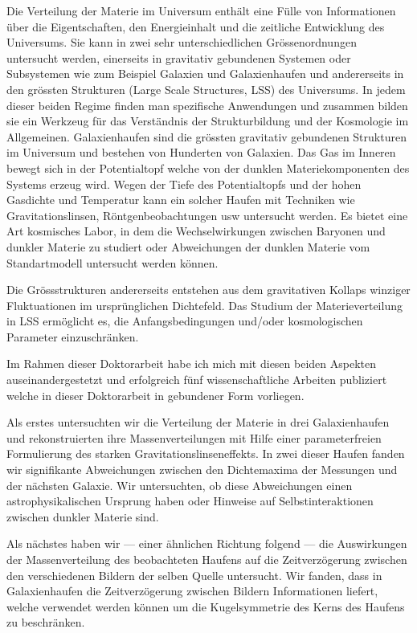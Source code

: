 \documentclass[
  11pt,
  twoside,
  openright,
  titlepage,
  headings=optiontoheadandtoc
]{scrbook}
\begin{document}
Die Verteilung der Materie im Universum enth{\"a}lt eine F{\"u}lle von
Informationen {\"u}ber die Eigentschaften, den Energieinhalt und die zeitliche
Entwicklung des Universums. Sie kann in zwei sehr unterschiedlichen
Gr{\"o}ssenordnungen untersucht werden, einerseits in gravitativ gebundenen
Systemen oder Subsystemen wie zum Beispiel Galaxien und Galaxienhaufen und andererseits in
den gr{\"o}ssten  Strukturen (Large Scale Structures, LSS) des Universums.
In jedem dieser beiden Regime finden man spezifische Anwendungen und zusammen bilden sie ein Werkzeug f\"ur das Verst{\"a}ndnis der Strukturbildung und der Kosmologie im Allgemeinen.
Galaxienhaufen sind die gr{\"o}ssten gravitativ gebundenen Strukturen im
Universum und bestehen von Hunderten von Galaxien. Das Gas im Inneren bewegt
sich in der Potentialtopf welche von der dunklen Materiekomponenten des Systems
erzeug wird. Wegen der Tiefe des Potentialtopfs und der hohen Gasdichte und
Temperatur kann ein solcher Haufen mit Techniken wie Gravitationslinsen,
R{\"o}ntgenbeobachtungen usw untersucht werden. Es bietet eine Art kosmisches
Labor, in dem die Wechselwirkungen zwischen Baryonen und dunkler Materie zu
studiert oder Abweichungen der dunklen Materie vom Standartmodell untersucht werden k\"onnen.

Die Gr{\"o}ssstrukturen andererseits entstehen aus dem gravitativen Kollaps winziger Fluktuationen im urspr{\"u}nglichen Dichtefeld. Das Studium der
Materieverteilung in LSS erm{\"o}glicht es, die Anfangsbedingungen und/oder
kosmologischen Parameter einzuschr{\"a}nken.

Im Rahmen dieser Doktorarbeit habe ich mich mit diesen beiden Aspekten
auseinandergestetzt und erfolgreich f{\"u}nf wissenschaftliche Arbeiten
publiziert welche in dieser Doktorarbeit in gebundener Form vorliegen.

Als erstes untersuchten wir die Verteilung der Materie in drei Galaxienhaufen
und rekonstruierten ihre Massenverteilungen mit Hilfe einer parameterfreien
Formulierung des starken Gravitationslinseneffekts. In zwei dieser Haufen fanden
wir signifikante Abweichungen zwischen den Dichtemaxima der Messungen und der
n{\"a}chsten Galaxie. Wir untersuchten, ob diese Abweichungen einen
astrophysikalischen Ursprung haben oder Hinweise auf Selbstinteraktionen
zwischen dunkler Materie sind.

Als n\"achstes haben wir --- einer {\"a}hnlichen Richtung folgend --- die
Auswirkungen der Massenverteilung des beobachteten Haufens auf die
Zeitverz\"ogerung zwischen den verschiedenen Bildern der selben Quelle untersucht.
Wir fanden, dass in Galaxienhaufen die Zeitverz{\"o}gerung zwischen Bildern
Informationen liefert, welche verwendet werden k{\"o}nnen um die Kugelsymmetrie
des Kerns des Haufens zu beschr{\"a}nken.
\end{document}
